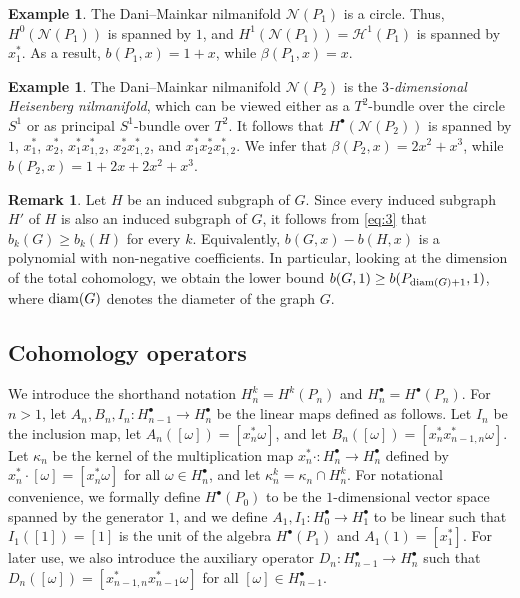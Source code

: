 \documentclass[12pt]{amsart}
\theoremstyle{definition}
\newtheorem{rem}[theorem]{Remark}
\newtheorem{example}[theorem]{Example}
\begin{document}
\begin{example}\label{ex:5} 
The Dani--Mainkar nilmanifold $\mathcal N(P_1)$ is a circle. Thus, $H^0(\mathcal N(P_1))$ is spanned by $1$, and $H^1(\mathcal N(P_1))=\mathcal H^1(P_1)$ is spanned by $x_1^*$. As a result, $b(P_1,x)=1+x$, while $\beta(P_1,x)=x$.
\end{example}

\begin{example}\label{ex:6} 
The Dani--Mainkar nilmanifold $\mathcal N(P_2)$ is the \emph{$3$-dimensional Heisenberg nilmanifold}, which can be viewed either as a $T^2$-bundle over the circle $S^{1}$ or as principal $S^1$-bundle over $T^2$. It follows that $H^\bullet(\mathcal N(P_2))$ is spanned by $1$, $x_1^*$, $x_2^*$, $x_1^*x_{1,2}^*$, $x_2^*x_{1,2}^*$, and $x_1^*x_2^*x_{1,2}^*$. We infer that $\beta(P_2,x)=2x^2+x^3$, while $b(P_2,x)=1+2x+2x^2+x^3$.
\end{example}

\begin{rem}\label{rem:8}
Let $H$ be an induced subgraph of $G$. Since every induced subgraph $H'$ of $H$ is also an induced subgraph of $G$, it follows from \eqref{eq:3} that $b_k(G)\ge b_k(H)$ for every $k$. Equivalently, $b(G,x)-b(H,x)$ is a polynomial with non-negative coefficients. In particular, looking at the dimension of the total cohomology, we obtain the lower bound $b(G,1)\ge b(P_{{\rm diam}(G)+1},1)$, where ${\rm diam}(G)$ denotes the diameter of the graph $G$.
\end{rem}

\subsection{Cohomology operators}\label{sec:2.3} We introduce the shorthand notation $H_n^k=H^k(P_n)$ and $H_n^\bullet=H^\bullet(P_n)$. For $n>1$, let $A_n,B_n,I_n \colon H^\bullet_{n-1}\to H^\bullet_n$ be the linear maps defined as follows. Let $I_n$ be the inclusion map, let $A_n([\omega])=[x_n^*\omega]$, and let $B_n([\omega])=[x_n^*x_{n-1,n}^*\omega]$. Let $\kappa_n$ be the kernel of the multiplication map $x_n^*\cdot \colon H^\bullet_n\to H^\bullet_n$ defined by $x_n^*\cdot [\omega]= [x_n^*\omega]$ for all $\omega\in H^\bullet_n$, and let $\kappa_n^k=\kappa_n\cap H_n^k$. For notational convenience, we formally define $H^\bullet(P_0)$ to be the $1$-dimensional vector space spanned by the generator $1$, and we define $A_1,I_1 \colon H^\bullet_0\to H^\bullet_1$ to be linear such that $I_1([1])=[1]$ is the unit of the algebra $H^\bullet(P_1)$ and $A_1(1)=[x_1^*]$. For later use, we also introduce the auxiliary operator $D_n \colon H^\bullet_{n-1}\to H^\bullet_n$ such that $D_n([\omega])=[x_{n-1,n}^*x_{n-1}^*\omega]$ for all $[\omega]\in H^\bullet_{n-1}$.
\end{document}
